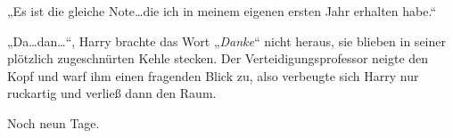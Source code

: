 „Es ist die gleiche Note…die ich in meinem eigenen ersten Jahr erhalten habe.“

„Da…dan…“,
Harry brachte das Wort „\emph{Danke}“ nicht heraus, sie blieben in seiner plötzlich zugeschnürten Kehle stecken.
Der Verteidigungsprofessor neigte den Kopf und warf ihm einen fragenden Blick zu, also verbeugte sich Harry nur ruckartig und verließ dann den Raum.

Noch neun Tage.

